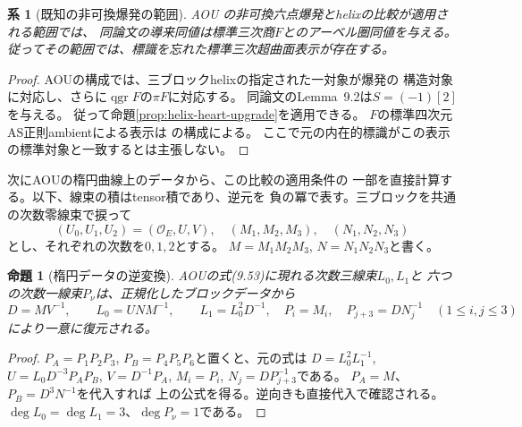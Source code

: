 \documentclass[11pt,a4paper]{ltjsarticle}
\newtheorem{proposition}[theorem]{命題}
\newtheorem{corollary}[theorem]{系}
\theoremstyle{definition}
\newcommand{\qgr}{\operatorname{qgr}}
\begin{document}
\begin{corollary}[既知の非可換爆発の範囲]\label{cor:aou-abelian-upgrade}
AOU\cite[Theorem~9.4 and its proof, (9.53), (9.57)]{AOU2024}
の非可換六点爆発とhelixの比較が適用される範囲では、
同論文の導来同値は標準三次商$F$とのアーベル圏同値を与える。
従ってその範囲では、標識を忘れた標準三次超曲面表示が存在する。
\end{corollary}
\begin{proof}
AOUの構成では、三ブロックhelixの指定された一対象が爆発の
構造対象に対応し、さらに$\qgr F$の$\pi F$に対応する。
同論文のLemma~9.2は$S=(-1)[2]$を与える。
従って命題\ref{prop:helix-heart-upgrade}を適用できる。
$F$の標準四次元AS正則ambientによる表示は
\cite[Section~12]{VdBBlowup2001}の構成による。
ここで元の内在的標識がこの表示の標準対象と一致するとは主張しない。
\end{proof}

次にAOUの楕円曲線上のデータから、この比較の適用条件の
一部を直接計算する。以下、線束の積はtensor積であり、逆元を
負の冪で表す。三ブロックを共通の次数零線束で捩って
\[
 (U_0,U_1,U_2)=(\mathcal O_E,U,V),\quad
 (M_1,M_2,M_3),\quad(N_1,N_2,N_3)
\]
とし、それぞれの次数を$0,1,2$とする。
$M=M_1M_2M_3$, $N=N_1N_2N_3$と書く。

\begin{proposition}[楕円データの逆変換]\label{prop:decuple-inverse}
AOUの式(9.53)に現れる次数三線束$L_0,L_1$と
六つの次数一線束$P_\nu$は、正規化したブロックデータから
\[
 D=MV^{-1},\qquad L_0=UNM^{-1},\qquad L_1=L_0^2D^{-1},
 \quad P_i=M_i,\quad P_{j+3}=DN_j^{-1}\quad(1\le i,j\le3)
\]
により一意に復元される。
\end{proposition}
\begin{proof}
$P_A=P_1P_2P_3$, $P_B=P_4P_5P_6$と置くと、元の式は
$D=L_0^2L_1^{-1}$,
$U=L_0D^{-3}P_AP_B$, $V=D^{-1}P_A$,
$M_i=P_i$, $N_j=DP_{j+3}^{-1}$である。
$P_A=M$、$P_B=D^3N^{-1}$を代入すれば
上の公式を得る。逆向きも直接代入で確認される。
$\deg L_0=\deg L_1=3$、$\deg P_\nu=1$である。
\end{proof}
\end{document}
